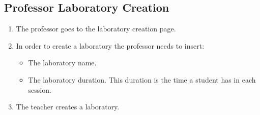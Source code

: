 \subsection{Professor Laboratory Creation}

\begin{enumerate}
    \item The professor goes to the laboratory creation page.
    \item In order to create a laboratory the professor needs to insert:
    \begin{itemize}
        \item The laboratory name.
        \item The laboratory duration. This duration is the time a student has in each session.
    \end{itemize}
    \item The teacher creates a laboratory.
\end{enumerate}
